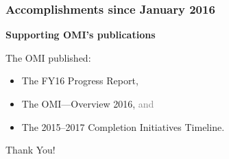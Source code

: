 \documentclass[14pt]{beamer}
\newcounter{a}
\newcounter{b}
\begin{document}
\begin{frame}
\frametitle{Accomplishments since January 2016}

\textbf{Supporting OMI's publications}

The OMI published:
\begin{itemize}
  \item The FY16 Progress Report,
  \item The OMI---Overview 2016, \textcolor{gray}{and}
  \item The 2015--2017 Completion Initiatives Timeline.
\end{itemize}


\end{frame}

\begin{frame}[allowframebreaks]

  \begin{center}
    \Huge Thank You!
  \end{center}

\end{frame}
\end{document}
